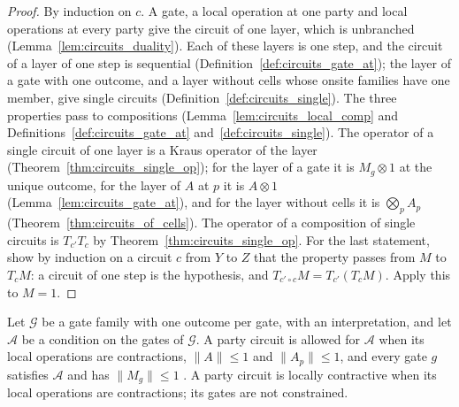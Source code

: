 \begin{proof}\leanok
    By induction on $c$. A gate, a local operation at one party and local operations
    at every party give the circuit of one layer, which is unbranched
    (Lemma~\ref{lem:circuits_duality}). Each of these layers is one step, and the
    circuit of a layer of one step is sequential
    (Definition~\ref{def:circuits_gate_at}); the layer of a gate with one outcome, and
    a layer without cells whose onsite families have one member, give single circuits
    (Definition~\ref{def:circuits_single}). The three properties pass to compositions
    (Lemma~\ref{lem:circuits_local_comp} and Definitions~\ref{def:circuits_gate_at}
    and~\ref{def:circuits_single}). The operator of a single circuit of one layer is a
    Kraus operator of the layer (Theorem~\ref{thm:circuits_single_op}); for the layer
    of a gate it is $M_g\otimes1$ at the unique outcome, for the layer of $A$ at $p$ it
    is $A\otimes1$ (Lemma~\ref{lem:circuits_gate_at}), and for the layer without cells
    it is $\bigotimes_pA_p$ (Theorem~\ref{thm:circuits_of_cells}). The operator of a
    composition of single circuits is $T_{c'}T_c$ by
    Theorem~\ref{thm:circuits_single_op}. For the last statement, show by induction on
    a circuit $c$ from $Y$ to $Z$ that the property passes from $M$ to $T_cM$: a circuit
    of one step is the hypothesis, and $T_{c'\circ c}M=T_{c'}(T_cM)$. Apply this to
    $M=1$.
\end{proof}

\begin{definition}
    \label{def:party_allowed}
    \leanok
    Let $\mathcal G$ be a gate family with one outcome per gate, with an
    interpretation, and let $\mathcal A$ be a condition on the gates of $\mathcal G$. A
    party circuit is allowed for $\mathcal A$ when its local operations are
    contractions, $\lVert A\rVert\le1$ and $\lVert A_p\rVert\le1$, and every gate $g$
    satisfies $\mathcal A$ and has $\lVert M_g\rVert\le1$
    \cite[Section~5.1]{OpenAI2026PolynomialPEPS}. A party circuit is locally
    contractive when its local operations are contractions; its gates are not
    constrained.
\end{definition}


